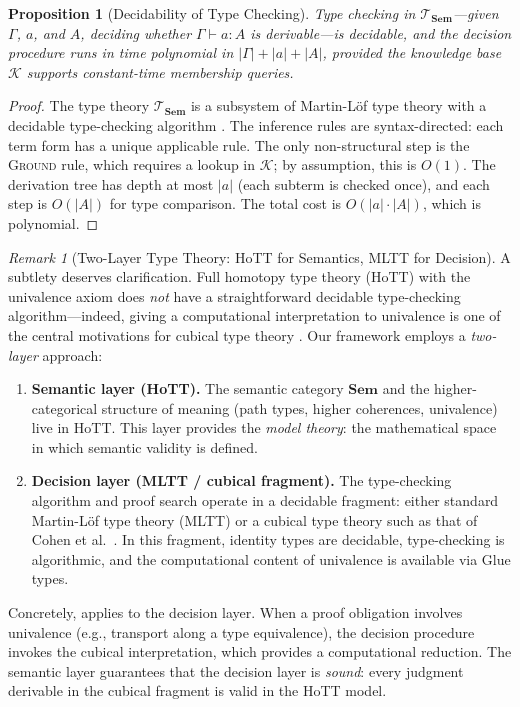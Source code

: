 \documentclass[11pt,a4paper]{article}
\theoremstyle{plain}
\newtheorem{proposition}[theorem]{Proposition}
\theoremstyle{definition}
\theoremstyle{remark}
\newtheorem{remark}[theorem]{Remark}
\newcommand{\Sem}{\mathbf{Sem}}
\begin{document}
\begin{proposition}[Decidability of Type Checking]\label{prop:decidable}
Type checking in $\mathcal{T}_{\Sem}$---given $\Gamma$, $a$, and $A$, deciding whether $\Gamma \vdash a : A$ is derivable---is decidable, and the decision procedure runs in time polynomial in $|\Gamma| + |a| + |A|$, provided the knowledge base $\mathcal{K}$ supports constant-time membership queries.
\end{proposition}

\begin{proof}
The type theory $\mathcal{T}_{\Sem}$ is a subsystem of Martin-L\"of type theory with a decidable type-checking algorithm \cite{martinlof1984, coquand1988}.
The inference rules are syntax-directed: each term form has a unique applicable rule.
The only non-structural step is the \textsc{Ground} rule, which requires a lookup in $\mathcal{K}$; by assumption, this is $O(1)$.
The derivation tree has depth at most $|a|$ (each subterm is checked once), and each step is $O(|A|)$ for type comparison.
The total cost is $O(|a| \cdot |A|)$, which is polynomial.
\end{proof}

\begin{remark}[Two-Layer Type Theory: HoTT for Semantics, MLTT for Decision]\label{rem:two-layer}
A subtlety deserves clarification.
Full homotopy type theory (HoTT) with the univalence axiom does \emph{not} have a straightforward decidable type-checking algorithm---indeed, giving a computational interpretation to univalence is one of the central motivations for cubical type theory \cite{cohen2018cubical}.
Our framework employs a \emph{two-layer} approach:
\begin{enumerate}[nosep]
  \item \textbf{Semantic layer (HoTT).} The semantic category $\Sem$ and the higher-categorical structure of meaning (path types, higher coherences, univalence) live in HoTT.
  This layer provides the \emph{model theory}: the mathematical space in which semantic validity is defined.
  \item \textbf{Decision layer (MLTT / cubical fragment).} The type-checking algorithm and proof search operate in a decidable fragment: either standard Martin-L\"{o}f type theory (MLTT) or a cubical type theory such as that of Cohen et al.\ \cite{cohen2018cubical}.
  In this fragment, identity types are decidable, type-checking is algorithmic, and the computational content of univalence is available via Glue types.
\end{enumerate}
Concretely,  applies to the decision layer.
When a proof obligation involves univalence (e.g., transport along a type equivalence), the decision procedure invokes the cubical interpretation, which provides a computational reduction.
The semantic layer guarantees that the decision layer is \emph{sound}: every judgment derivable in the cubical fragment is valid in the HoTT model.
\end{remark}
\end{document}
